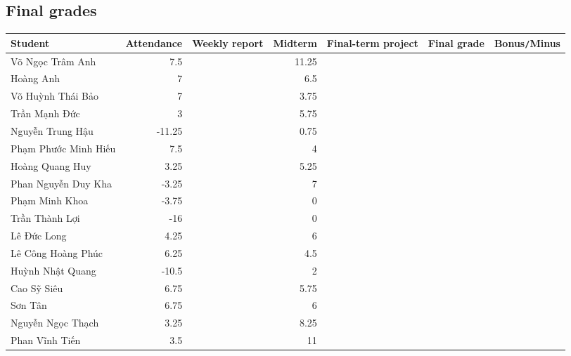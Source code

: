 \documentclass{article}
\begin{document}

\subsection{Final grades}

\begin{table}[H]
    \centering
    \begin{tabular}{|l|r|r|r|r|r|r|}
        \hline
        Student & Attendance & Weekly report & Midterm & Final-term project & Final grade & Bonus{\tt/}Minus\\
        \hline
        {\sc Võ Ngọc Trâm Anh} & 7.5 &  & 11.25 &  &  &  \\
        \hline
        {\sc Hoàng Anh} & 7 &  & 6.5 &  &  &  \\
        \hline
        {\sc Võ Huỳnh Thái Bảo} & 7 &  & 3.75 &  &  &  \\
        \hline
        {\sc Trần Mạnh Đức} & 3 &  & 5.75 &  &  &  \\
        \hline
        {\sc Nguyễn Trung Hậu} & -11.25 &  & 0.75 &  &  &  \\
        \hline
        {\sc Phạm Phước Minh Hiếu} & 7.5 &  & 4 &  &  &  \\
        \hline
        {\sc Hoàng Quang Huy} & 3.25 &  & 5.25 &  &  &  \\
        \hline
        {\sc Phan Nguyễn Duy Kha} & -3.25 &  & 7 &  &  &  \\
        \hline
        {\sc Phạm Minh Khoa} & -3.75 &  & 0 &  &  &  \\
        \hline
        {\sc Trần Thành Lợi} & -16 &  & 0 &  &  &  \\
        \hline
        {\sc Lê Đức Long} & 4.25 &  & 6 &  &  &  \\
        \hline
        {\sc Lê Công Hoàng Phúc} & 6.25 & & 4.5 &  &  &  \\
        \hline
        {\sc Huỳnh Nhật Quang} & -10.5 &  & 2 &  &  &  \\
        \hline
        {\sc Cao Sỹ Siêu} & 6.75 &  & 5.75 &  &  &  \\
        \hline
        {\sc Sơn Tân} & 6.75 &  & 6 &  &  &  \\
        \hline
        {\sc Nguyễn Ngọc Thạch} & 3.25 &  & 8.25 &  &  &  \\
        \hline
        {\sc Phan Vĩnh Tiến} & 3.5 &  & 11 &  &  &  \\
        \hline
    \end{tabular}
\end{table}

\end{document}
